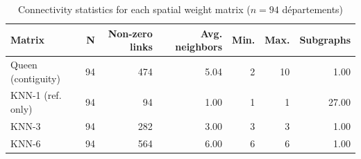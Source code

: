 \begin{table}[ht]
\centering
\caption{Connectivity statistics for each spatial weight matrix ($n = 94$ d\'epartements)} 
\label{tab:wmat_stats}
\begin{tabular}{lrrrrrr}
  \toprule
Matrix & N & Non-zero links & Avg. neighbors & Min. & Max. & Subgraphs \\ 
  \midrule
Queen (contiguity) &  94 & 474 & 5.04 &   2 &  10 & 1.00 \\ 
  KNN-1 (ref. only) &  94 &  94 & 1.00 &   1 &   1 & 27.00 \\ 
  KNN-3 &  94 & 282 & 3.00 &   3 &   3 & 1.00 \\ 
  KNN-6 &  94 & 564 & 6.00 &   6 &   6 & 1.00 \\ 
   \bottomrule
\end{tabular}
\end{table}
